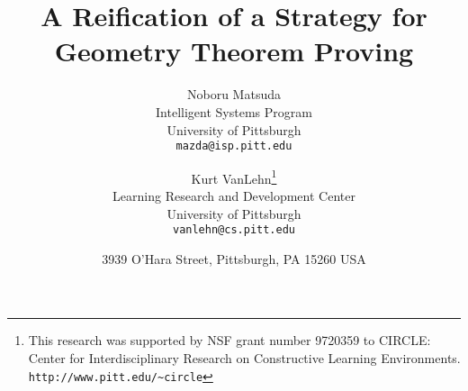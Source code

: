 \documentclass[11pt]{article}
\title{
  \bfseries A Reification of a Strategy for Geometry Theorem Proving
  }
\author{
  Noboru Matsuda \\
  Intelligent Systems Program \\
  University of Pittsburgh \\
  \texttt{mazda@isp.pitt.edu}
  \and
  Kurt VanLehn\thanks{This research was supported by NSF grant number
  9720359 to CIRCLE: Center
  for Interdisciplinary Research on Constructive Learning
  Environments. \texttt{http://www.pitt.edu/\~{}circle} } \\
  Learning Research and Development Center \\
  University of Pittsburgh\\
  \texttt{vanlehn@cs.pitt.edu}
  }
\date{
  3939 O'Hara Street, Pittsburgh, PA 15260 USA
  }
\begin{document}
\maketitle

\begin{abstract}
 
\end{abstract}









\end{document}
